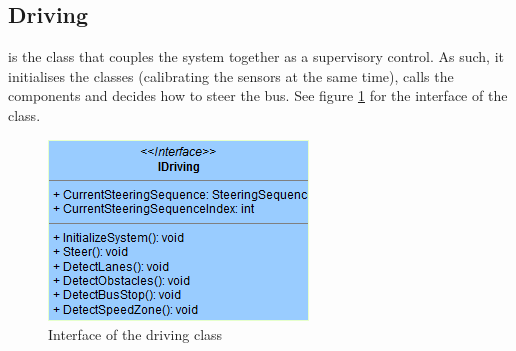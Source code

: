 


\subsection{Driving}
 is the class that couples the system together as a supervisory control. As such, it initialises the classes (calibrating the sensors at the same time), calls the components and decides how to steer the bus. See figure \ref{fig:interfaceDriving} for the interface of the  class.

\begin{figure}[ht]
\begin{centering}
    \includegraphics[scale=0.8]{Images/Design/interfaceDriving.png}
    \caption{Interface of the driving class}
    \label{fig:interfaceDriving}
    \end{centering}
\end{figure}



